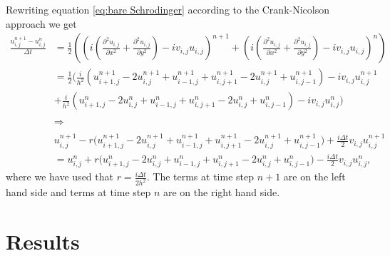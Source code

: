 \documentclass[english,notitlepage,reprint,nofootinbib]{revtex4-2}  %
\begin{document}
	\noindent
	Rewriting equation \ref{eq:bare Schrodinger}
	according to the Crank-Nicolson approach we get 
	\onecolumngrid
	\begin{equation}
		\begin{aligned}
		\frac{u^{n+1}_{i,j}-u^{n}_{i,j}}{\Delta t} &=  \frac{1}{2}\left(\left(i(\frac{\partial^2 u_{i,j}}{\partial x^2} + \frac{\partial^2 u_{i,j}}{\partial y^2}) -i v_{i,j} u_{i,j}\right)^{n+1}
	    +   \left(i(\frac{\partial^2 u_{i,j}}{\partial x^2} + \frac{\partial^2 u_{i,j}}{\partial y^2}) -i v_{i,j} u_{i,j}\right)^{n} \right)\\
		&=  \frac{1}{2}\Big(    \frac{i}{h^2}\left(  u^{n+1}_{i+1,j}-2u^{n+1}_{i,j}+u^{n+1}_{i-1,j}   +u^{n+1}_{i,j+1}-2u^{n+1}_{i,j}+u^{n+1}_{i,j-1}\right)-iv_{i,j}u^{n+1}_{i,j}\\
		&+ \frac{i}{h^2}\left(  u^{n}_{i+1,j}-2u^{n}_{i,j}+u^{n}_{i-1,j}   +u^{n}_{i,j+1}-2u^{n}_{i,j}+u^{n}_{i,j-1}\right)-iv_{i,j}u^{n}_{i,j}      \Big)\\ 
		&\ \\
		&\Rightarrow \\ 
		&\ \\
		&u^{n+1}_{i,j} -r\Big(  u^{n+1}_{i+1,j}-2u^{n+1}_{i,j}+u^{n+1}_{i-1,j}   +u^{n+1}_{i,j+1}-2u^{n+1}_{i,j}+u^{n+1}_{i,j-1}\Big) +\frac{i\Delta t}{2}v_{i,j}u^{n+1}_{i,j}\\
		&= u^n_{i,j}+ r\Big(  u^{n}_{i+1,j}-2u^{n}_{i,j}+u^{n}_{i-1,j}   +u^{n}_{i,j+1}-2u^{n}_{i,j}+u^{n}_{i,j-1}\Big)-\frac{i\Delta t}{2}v_{i,j}u^{n}_{i,j},
		\end{aligned}
	\end{equation}
	\twocolumngrid
	\noindent
	where we have used that $r = \frac{i\Delta t}{2h^2}$. The terms at time
	step $n+1$ are on the left hand side and terms at time step $n$ are on the right
	hand side.

	


	
	
	\section{Results}\label{sec:results}
\end{document}
